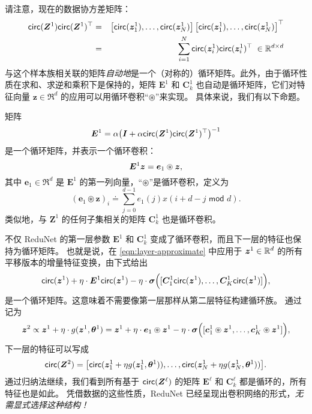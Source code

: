 \documentclass[../../book-main_zh.tex]{subfiles}
\begin{document}
请注意，现在的数据协方差矩阵：
\begin{eqnarray}
\mathsf{circ}(\bm Z^1) \mathsf{circ}(\bm Z^1)^\top
&=& \left[ \mathsf{circ}(\bm{z}_{1}^1), \dots, \mathsf{circ}(\bm{z}_{N}^1) \right] \left[ \mathsf{circ}(\bm{z}_{1}^1), \dots, \mathsf{circ} (\bm{z}_{N}^1) \right]^\top \nonumber \\
&=& \sum_{i =1}^N \mathsf{circ}(\bm{z}_{i}^1) \mathsf{circ}(\bm{z}_{i}^1)^\top \;\in \mathbb{R}^{d\times d}
\end{eqnarray}
与这个样本族相关联的矩阵{\em 自动地}是一个（对称的）循环矩阵。此外，由于循环性质在求和、求逆和乘积下是保持的，矩阵 $\bm E^1$ 和 $\bm C^1_k$ 也自动是循环矩阵，它们对特征向量 $\bm z \in \Re^d$ 的应用可以用循环卷积“$\circledast$”来实现。
具体来说，我们有以下命题。

\begin{proposition}[$\bm E^1$ 和 $\bm C^1_k$ 的卷积结构]
矩阵
\begin{equation}
    \bm E^1 = \alpha\big(\bm I + \alpha \mathsf{circ}(\bm Z^1) \mathsf{circ}(\bm Z^1)^\top \big)^{-1}
\end{equation}
是一个循环矩阵，并表示一个循环卷积：
$$\bm E^1 \bm{z} = \bm e_1 \circledast \bm{z},$$
其中 $\bm e_1 \in \Re^d$ 是 $\bm E^1$ 的第一列向量，“$\circledast$”是循环卷积，定义为
\begin{equation*}
    (\bm e_1 \circledast \bm z)_{i} \doteq \sum_{j=0}^{d-1} e_1(j) x(i+ d-j \,\, \textsf{mod} \,\,d).
\end{equation*}
类似地，与 $\bm Z^1$ 的任何子集相关的矩阵 $\bm C^1_k$ 也是循环卷积。
\label{prop:circular-conv-1}
\end{proposition}

不仅 ReduNet 的第一层参数 $\bm E^1$ 和 $\bm{C}^1_k$ 变成了循环卷积，而且下一层的特征也保持为循环矩阵。
也就是说，在 \eqref{eqn:layer-approximate} 中应用于 $\bm{z}^1 \in \mathbb{R}^d$ 的所有平移版本的增量特征变换，由下式给出
\begin{equation}
    \mathsf{circ}(\bm{z}^1) + \eta \cdot \bm E^1 \mathsf{circ}(\bm{z}^1) - \eta \cdot \bm \sigma \Big([\bm{C}_1^1 \mathsf{circ}(\bm{z}^1), \ldots, \bm{C}^1_K \mathsf{circ}(\bm{z}^1)] \Big),
\end{equation}
是一个循环矩阵。这意味着不需要像第一层那样从第二层特征构建循环族。
通过记为
\begin{equation}
\bm{z}^{2} \propto \bm{z}^{1} +\eta \cdot g(\bm{z}^{1}, \bm \theta^{1}) =  \bm{z}^1 + \eta \cdot \bm e_{1} \circledast \bm{z}^{1} -  \eta \cdot \bm \sigma\Big([\bm{c}_{1}^{1} \circledast \bm{z}^{1}, \dots, \bm{c}^{1}_{K} \circledast \bm{z}^{1}]\Big),
\label{eqn:approximate-convolution}
\end{equation}
下一层的特征可以写成
$$\mathsf{circ}(\bm Z^2) = \big[ \mathsf{circ}( \bm z_{1}^1 + \eta g( \bm z_{1}^1, \bm \theta^1)), \dots, \mathsf{circ}( \bm z_{N}^1 + \eta g(\bm z_{N}^1, \bm \theta^1)) \big].$$
通过归纳法继续，我们看到所有基于 $\mathsf{circ}(\bm Z^\ell)$ 的矩阵 $\bm E^\ell$ 和 $\bm C^\ell_k$ 都是循环的，所有特征也是如此。
凭借数据的这些性质，ReduNet 已经呈现出卷积网络的形式，{\em 无需显式选择这种结构！}
\end{document}
